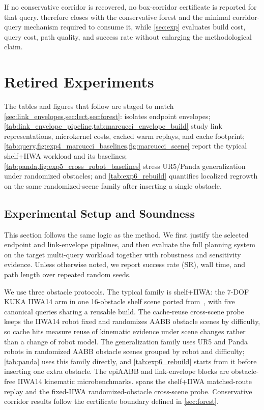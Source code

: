 \documentclass[journal]{IEEEtran}
\begin{document}
If no conservative corridor is recovered, no box-corridor certificate is
reported for that query.  therefore closes with the
conservative forest and the minimal corridor-query mechanism required to
consume it, while \cref{sec:exp} evaluates build cost, query cost, path
quality, and success rate without enlarging the methodological claim.



\iffalse
\section{Retired Experiments}\label{sec:exp_retired}

The tables and figures that follow are staged to match \cref{sec:link_envelopes,sec:lect,sec:forest}:
 isolates endpoint envelopes; \cref{tab:link_envelope_pipeline,tab:marcucci_envelope_build} study link representations, microkernel costs, cached warm replays, and cache footprint; \cref{tab:query,fig:exp4_marcucci_baselines,fig:marcucci_scene} report the typical shelf+IIWA workload and its baselines; \cref{tab:panda,fig:exp5_cross_robot_baselines} stress UR5/Panda generalization under randomized obstacles; and \cref{tab:exp6_rebuild} quantifies localized regrowth on the same randomized-scene family after inserting a single obstacle.

\subsection{Experimental Setup and Soundness}\label{sec:exp_setup_sound}

This section follows the same logic as the method. We first justify
the selected endpoint and link-envelope pipelines, and then evaluate the full
planning system on the target multi-query workload together with robustness and
sensitivity evidence. Unless otherwise noted, we report success rate (SR), wall
time, and path length over repeated random seeds.

We use three obstacle protocols. The typical family is shelf+IIWA: the 7-DOF
KUKA IIWA14 arm in one 16-obstacle shelf scene ported
from~\cite{marcucci2023motion}, with five canonical queries sharing a reusable
build. The cache-reuse cross-scene probe keeps the IIWA14 robot fixed and
randomizes AABB obstacle scenes by difficulty, so cache hits measure reuse of
kinematic evidence under scene changes rather than a change of robot model. The
generalization family uses UR5 and Panda robots in randomized AABB obstacle
scenes grouped by robot and difficulty; \cref{tab:panda} uses this family
directly, and \cref{tab:exp6_rebuild} starts from it before inserting one extra
obstacle. The epiAABB and link-envelope blocks are obstacle-free IIWA14
kinematic microbenchmarks.  spans the
shelf+IIWA matched-route replay and the fixed-IIWA randomized-obstacle
cross-scene probe. Conservative corridor results follow the certificate boundary
defined in \cref{sec:forest}.
\end{document}
